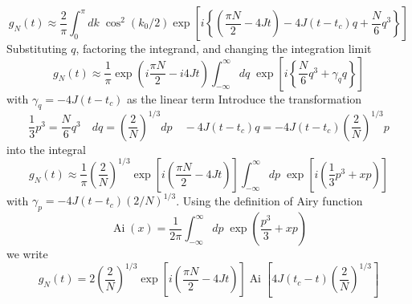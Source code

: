 \documentclass[../../../main.tex]{subfiles}
\begin{document}
\begin{equation*}
  g_N(t) \approx \frac{2}{\pi} \int_{0}^{\pi} dk \; \cos^2\left( k_0/2\right) \exp \left[ i \left\{ \left( \frac{\pi N}{2} - 4Jt \right) - 4J(t-t_c)q + \frac{N}{6}q^3 \right\} \right]
\end{equation*}
Substituting $q$, factoring the integrand, and changing the integration limit
\begin{equation*}
  g_N(t) \approx \frac{1}{\pi} \exp \left( i\frac{\pi N}{2} -i 4Jt \right) \int_{-\infty}^{\infty} dq \;  \exp \left[ i \left\{\frac{N}{6}q^3 +\gamma_q q  \right\} \right]
\end{equation*}
with $\gamma_q = -4J(t-t_c)$ as the linear term
Introduce the transformation
\begin{equation*}
  \frac{1}{3}p^3 = \frac{N}{6}q^3 \quad dq = \left(\frac{2}{N}\right)^{1/3}dp
  \quad -4J(t-t_c)q = -4J(t-t_c)\left(\frac{2}{N}\right)^{1/3}p
\end{equation*}
into the integral
\begin{equation*}
  g_N(t) \approx \frac{1}{\pi} \left(\frac{2}{N}\right)^{1/3} \exp \left[ i \left( \frac{\pi N}{2} - 4Jt \right) \right] \int_{-\infty}^{\infty} dp \; \exp \left[ i \left( \frac{1}{3}p^3 + xp \right) \right]
\end{equation*}
with $\gamma_p = -4J(t-t_c)(2/N) ^{1/3}$.
Using the definition of Airy function
\begin{equation*}
  \operatorname{Ai} (x) = \frac{1 }{2\pi} \int_{-\infty }^{\infty } dp\; \exp \left( \frac{p ^3}{3 } + xp \right)
\end{equation*}
we write
\begin{equation*}
  g_N(t)= 2\left(\frac{2}{N}\right)^{1/3} \exp \left[ i \left( \frac{\pi N}{2} - 4Jt \right) \right] \operatorname{Ai}\left[ 4J(t_c - t) \left( \frac{2 }{N }\right) ^{1/3}   \right]
\end{equation*}
\end{document}
